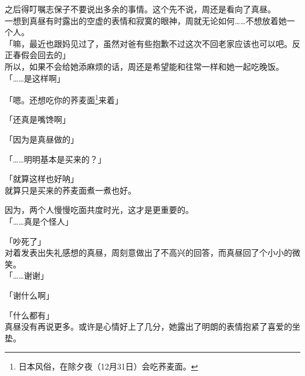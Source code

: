之后得叮嘱志保子不要说出多余的事情。这个先不说，周还是看向了真昼。\\

一想到真昼有时露出的空虚的表情和寂寞的眼神，周就无论如何……不想放着她一个人。\\

「嘛，最近也跟妈见过了，虽然对爸有些抱歉不过这次不回老家应该也可以吧。反正春假会回去的」\\

所以，如果不会给她添麻烦的话，周还是希望能和往常一样和她一起吃晚饭。\\

「……是这样啊」

「嗯。还想吃你的荞麦面\footnote{日本风俗，在除夕夜（12月31日）会吃荞麦面。}来着」

「还真是嘴馋啊」

「因为是真昼做的」

「……明明基本是买来的？」

「就算这样也好呐」\\

就算只是买来的荞麦面煮一煮也好。

因为，两个人慢慢吃面共度时光，这才是更重要的。\\

「……真是个怪人」

「吵死了」\\

对着发表出失礼感想的真昼，周刻意做出了不高兴的回答，而真昼回了个小小的微笑。\\

「……谢谢」

「谢什么啊」

「什么都有」\\

真昼没有再说更多。或许是心情好上了几分，她露出了明朗的表情抱紧了喜爱的坐垫。\\
